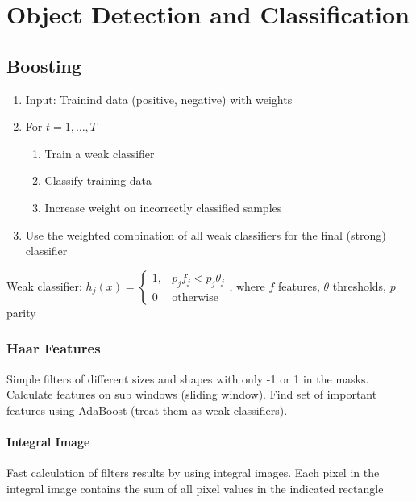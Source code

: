\section{Object Detection and Classification}

\subsection{Boosting}
\begin{enumerate}
    \item Input: Trainind data (positive, negative) with weights
    \item For $t=1,\ldots,T$
          \begin{enumerate}
              \item Train a weak classifier
              \item Classify training data
              \item Increase weight on incorrectly classified samples
          \end{enumerate}
    \item Use the weighted combination of all weak classifiers for the final (strong) classifier
\end{enumerate}
Weak classifier: $h_j(x)=\left\{\begin{matrix}1, &p_j f_j < p_j \theta_j\\0 & \text{otherwise}\end{matrix}\right.$, where $f$ features, $\theta$ thresholds, $p$ parity

\subsubsection{Haar Features}
Simple filters of different sizes and shapes with only -1 or 1 in the masks.
Calculate features on sub windows (sliding window).
Find set of important features using AdaBoost (treat them as weak classifiers).

\paragraph{Integral Image}
Fast calculation of filters results by using integral images.
Each pixel in the integral image contains the sum of all pixel values in the indicated rectangle

